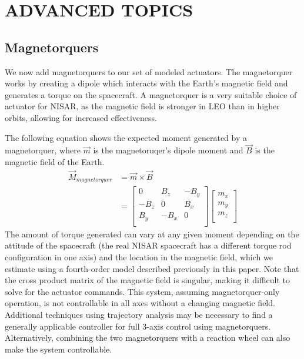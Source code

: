 \section{\Large ADVANCED TOPICS}
\subsection{Magnetorquers}
We now add magnetorquers to our set of modeled actuators. The magnetorquer works by creating a dipole which interacts with the Earth's magnetic field and generates a torque on the spacecraft. A magnetorquer is a very suitable choice of actuator for NISAR, as the magnetic field is stronger in LEO than in higher orbits, allowing for increased effectiveness.

The following equation shows the expected moment generated by a magnetorquer, where $\Vec{m}$ is the magnetoruqer's dipole moment and $\Vec{B}$ is the magnetic field of the Earth.
\begin{align*}
    \Vec{M}_{magnetorquer} &= \Vec{m} \times \Vec{B} \\
    &= \begin{bmatrix}
        0 & B_{z} & -B_{y} \\
        -B_{z} & 0 & B_{x} \\
        B_{y} & -B_{x} & 0 \\
    \end{bmatrix}
    \begin{bmatrix}
        m_{x} \\
        m_{y} \\
        m_{z} \\
    \end{bmatrix}
\end{align*}
The amount of torque generated can vary at any given moment depending on the attitude of the spacecraft (the real NISAR spacecraft has a different torque rod configuration in one axis) and the location in the magnetic field, which we estimate using a fourth-order model described previously in this paper. Note that the cross product matrix of the magnetic field is singular, making it difficult to solve for the actuator commands. This system, assuming magnetorquer-only operation, is not controllable in all axes without a changing magnetic field. Additional techniques using trajectory analysis may be necessary to find a generally applicable controller for full 3-axis control using magnetorquers. Alternatively, combining the two magnetorquers with a reaction wheel can also make the system controllable.

